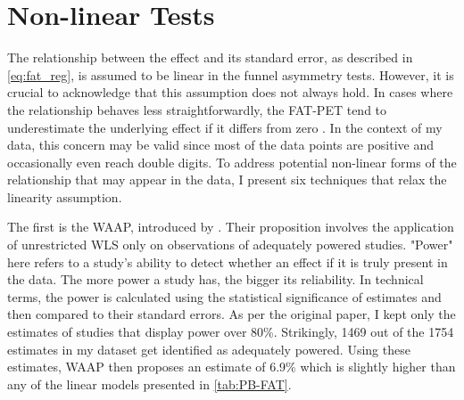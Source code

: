 \begin{table}[!t]
  \end{table}
  


\section{Non-linear Tests}
\label{sec:nonlinear_tests}

The relationship between the effect and its standard error, as described in \autoref{eq:fat_reg}, is assumed to be linear in the funnel asymmetry tests. However, it is crucial to acknowledge that this assumption does not always hold. In cases where the relationship behaves less straightforwardly, the \ac{FAT-PET} tend to underestimate the underlying effect if it differs from zero \citep{stanley2014meta}. In the context of my data, this concern may be valid since most of the data points are positive and occasionally even reach double digits. To address potential non-linear forms of the relationship that may appear in the data, I present six techniques that relax the linearity assumption. 

The first is the \ac{WAAP}, introduced by \cite{Ioannidis2017Waap}. Their proposition involves the application of unrestricted \ac{WLS} only on observations of adequately powered studies. "Power" here refers to a study's ability to detect whether an effect if it is truly present in the data. The more power a study has, the bigger its reliability. In technical terms, the power is calculated using the statistical significance of estimates and then compared to their standard errors. As per the original paper, I kept only the estimates of studies that display power over 80\%. Strikingly, 1469 out of the 1754 estimates in my dataset get identified as adequately powered. Using these estimates, \ac{WAAP} then proposes an estimate of 6.9\% which is slightly higher than any of the linear models presented in \autoref{tab:PB-FAT}.


